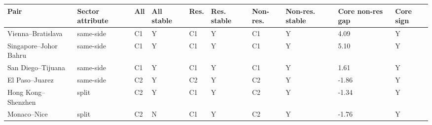 \begin{tabular}{@{}llllllllll@{}}\toprule
Pair & Sector attribute & All & All stable & Res. & Res. stable & Non-res. & Non-res. stable & Core non-res gap & Core sign \\
\midrule
Vienna--Bratislava & same-side & C1 & Y & C1 & Y & C1 & Y & 4.09 & Y \\
Singapore--Johor Bahru & same-side & C1 & Y & C1 & Y & C1 & Y & 5.10 & Y \\
San Diego--Tijuana & same-side & C1 & Y & C1 & Y & C1 & Y & 1.61 & Y \\
El Paso--Juarez & same-side & C2 & Y & C2 & Y & C2 & Y & -1.86 & Y \\
Hong Kong--Shenzhen & split & C2 & Y & C1 & Y & C2 & Y & -1.34 & Y \\
Monaco--Nice & split & C2 & N & C1 & Y & C2 & Y & -1.76 & Y \\
\bottomrule
\end{tabular}
